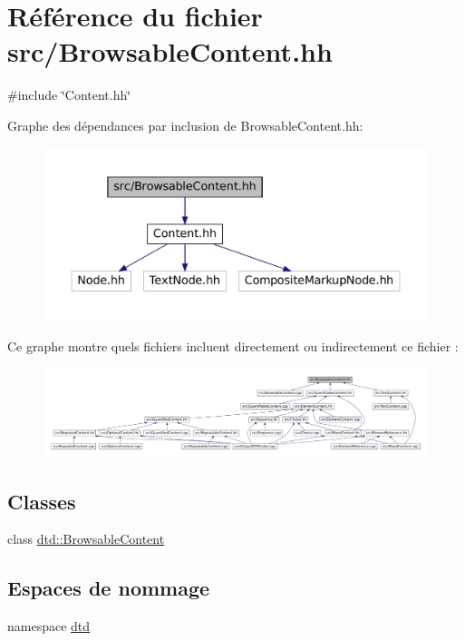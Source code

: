 \hypertarget{_browsable_content_8hh}{
\section{Référence du fichier src/BrowsableContent.hh}
\label{_browsable_content_8hh}
}
{\ttfamily \#include \char`\"{}Content.hh\char`\"{}}\par
Graphe des dépendances par inclusion de BrowsableContent.hh:\nopagebreak
\begin{figure}[H]
\begin{center}
\leavevmode
\includegraphics[width=400pt]{_browsable_content_8hh__incl}
\end{center}
\end{figure}
Ce graphe montre quels fichiers incluent directement ou indirectement ce fichier :\nopagebreak
\begin{figure}[H]
\begin{center}
\leavevmode
\includegraphics[width=400pt]{_browsable_content_8hh__dep__incl}
\end{center}
\end{figure}
\subsection*{Classes}
\begin{DoxyCompactItemize}
\item 
class \hyperlink{classdtd_1_1_browsable_content}{dtd::BrowsableContent}
\end{DoxyCompactItemize}
\subsection*{Espaces de nommage}
\begin{DoxyCompactItemize}
\item 
namespace \hyperlink{namespacedtd}{dtd}
\end{DoxyCompactItemize}
